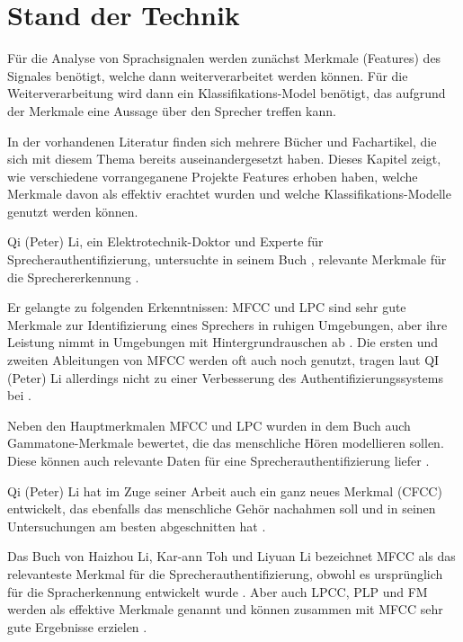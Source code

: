 \section{Stand der Technik}

Für die Analyse von Sprachsignalen werden zunächst Merkmale (Features) des Signales benötigt, welche dann weiterverarbeitet werden können.
Für die Weiterverarbeitung wird dann ein Klassifikations-Model benötigt, das aufgrund der Merkmale eine Aussage über den Sprecher treffen kann.

In der vorhandenen Literatur finden sich mehrere Bücher und Fachartikel, die sich mit diesem Thema bereits auseinandergesetzt haben. 
Dieses Kapitel zeigt, wie verschiedene vorrangeganene Projekte Features erhoben haben, welche Merkmale davon als effektiv erachtet wurden und welche Klassifikations-Modelle genutzt werden können.

Qi (Peter) Li, ein Elektrotechnik-Doktor und Experte für Sprecherauthentifizierung, untersuchte in seinem Buch , relevante Merkmale für die Sprechererkennung \autocite{li_speaker_2012}.

Er gelangte zu folgenden Erkenntnissen:
MFCC und LPC sind sehr gute Merkmale zur Identifizierung eines Sprechers in ruhigen Umgebungen, aber ihre Leistung nimmt in Umgebungen mit Hintergrundrauschen ab \autocite[vgl.][S. 136]{li_speaker_2012}.
Die ersten und zweiten Ableitungen von MFCC werden oft auch noch genutzt, tragen laut QI (Peter) Li allerdings nicht zu einer Verbesserung des Authentifizierungssystems bei \autocite[vgl.][S. 143]{li_speaker_2012}.

Neben den Hauptmerkmalen MFCC und LPC wurden in dem Buch auch Gammatone-Merkmale bewertet, die das menschliche Hören modellieren sollen.
Diese können auch relevante Daten für eine Sprecherauthentifizierung liefer \autocite[vgl.][S. 111, 117]{li_speaker_2012}.

Qi (Peter) Li hat im Zuge seiner Arbeit auch ein ganz neues Merkmal (CFCC) entwickelt, das ebenfalls das menschliche Gehör nachahmen soll und in seinen Untersuchungen am besten abgeschnitten hat \autocite[vgl.][S. 135]{li_speaker_2012}.

Das Buch  von Haizhou Li, Kar-ann Toh und Liyuan Li bezeichnet MFCC als das relevanteste Merkmal für die Sprecherauthentifizierung, obwohl es ursprünglich für die Spracherkennung entwickelt wurde \autocite[vgl.][S. 7, 51]{li_advanced_nodate}.
Aber auch LPCC, PLP und FM werden als effektive Merkmale genannt und können zusammen mit MFCC sehr gute Ergebnisse erzielen \autocite[vgl.][S. 6, 67]{li_advanced_nodate}.

